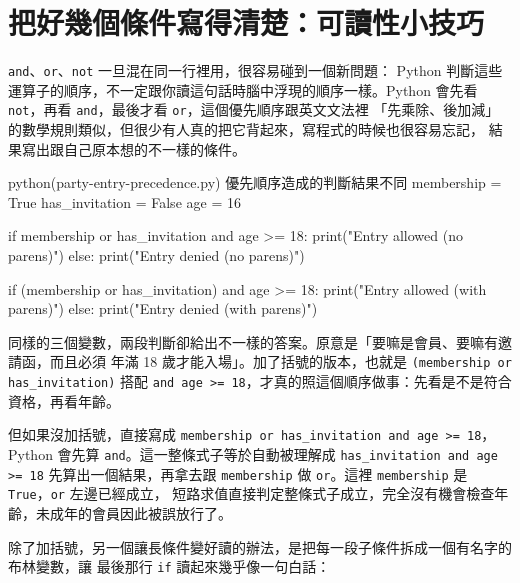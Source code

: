 \section{把好幾個條件寫得清楚：可讀性小技巧}
\label{sec:readable-conditions}

\texttt{and}、\texttt{or}、\texttt{not} 一旦混在同一行裡用，很容易碰到一個新問題：
Python 判斷這些運算子的順序，不一定跟你讀這句話時腦中浮現的順序一樣。Python 會先看
\texttt{not}，再看 \texttt{and}，最後才看 \texttt{or}，這個優先順序跟英文文法裡
「先乘除、後加減」的數學規則類似，但很少有人真的把它背起來，寫程式的時候也很容易忘記，
結果寫出跟自己原本想的不一樣的條件。

\begin{example}{python}{(party-entry-precedence.py) 優先順序造成的判斷結果不同}
membership = True
has_invitation = False
age = 16

if membership or has_invitation and age >= 18:
    print("Entry allowed (no parens)")
else:
    print("Entry denied (no parens)")

if (membership or has_invitation) and age >= 18:
    print("Entry allowed (with parens)")
else:
    print("Entry denied (with parens)")
\end{example}


同樣的三個變數，兩段判斷卻給出不一樣的答案。原意是「要嘛是會員、要嘛有邀請函，而且必須
年滿 18 歲才能入場」。加了括號的版本，也就是 \texttt{(membership or has\_invitation)}
搭配 \texttt{and age >= 18}，才真的照這個順序做事：先看是不是符合資格，再看年齡。

但如果沒加括號，直接寫成 \texttt{membership or has\_invitation and age >= 18}，
Python 會先算 \texttt{and}。這一整條式子等於自動被理解成
\texttt{has\_invitation and age >= 18} 先算出一個結果，再拿去跟 \texttt{membership}
做 \texttt{or}。這裡 \texttt{membership} 是 \texttt{True}，\texttt{or} 左邊已經成立，
短路求值直接判定整條式子成立，完全沒有機會檢查年齡，未成年的會員因此被誤放行了。


除了加括號，另一個讓長條件變好讀的辦法，是把每一段子條件拆成一個有名字的布林變數，讓
最後那行 \texttt{if} 讀起來幾乎像一句白話：

